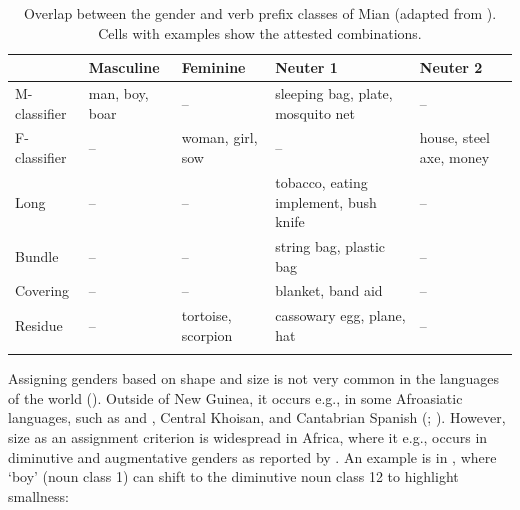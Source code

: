 \documentclass[output=collectionpaper]{langsci/langscibook}
\begin{document}
%
%

\begin{table}[htb]
\small
\begin{tabularx}{\textwidth}{lQQQQ}
\lsptoprule
  & Masculine & Feminine & Neuter 1 & Neuter 2 \\
\midrule
M-classifier & man, boy, boar & -- & sleeping bag, plate, mosquito net & -- \\
F-classifier & -- & woman, girl, sow & -- & house, steel axe, money \\
Long & -- & -- & tobacco, eating implement, bush knife & -- \\
Bundle & -- & -- & string bag, plastic bag & -- \\
Covering & -- & -- & blanket, band aid & -- \\
Residue & -- & tortoise, scorpion & cassowary egg, plane, hat & -- \\
\lspbottomrule
\end{tabularx}
\caption{Overlap between the gender and verb prefix classes of Mian (adapted from \citealt[34]{Fedden2017}). Cells with examples show the attested combinations.}
\label{tab:Svard:NEW}
\end{table}


Assigning genders based on shape and size is not very common in the languages of the world (\citealt[chap.~11]{Aikhenvald2000}). Outside of New Guinea, it occurs e.g., in some Afroasiatic languages, such as  and , Central Khoisan, and Cantabrian Spanish (\citealt[277]{Aikhenvald2000}; \citealt[191]{Heine1982}). However, size as an assignment criterion is widespread in Africa, where it e.g., occurs in diminutive and augmentative genders as reported by \citet{DiGarbo2014}. An example is in , where `boy' (noun class 1) can shift to the diminutive noun class 12 to highlight smallness:

%
\end{document}
